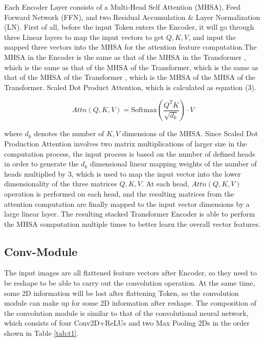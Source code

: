 \documentclass{article}
\begin{document}
Each Encoder Layer consists of a Multi-Head Self Attention (MHSA), Feed Forward Network (FFN), and two Residual Accumulation \& Layer Normalization (LN). First of all, before the input Token enters the Encoder, it will go through three Linear layers to map the input vectors to get $Q,K,V$, and input the mapped three vectors into the MHSA for the attention feature computation.The MHSA in the Encoder is the same as that of the MHSA in the Transformer \cite{9}, which is the same as that of the MHSA of the Transformer, which is the same as that of the MHSA of the Transformer \cite{9}, which is the MHSA of the MHSA of the Transformer. Scaled Dot Product Attention, which is calculated as equation (3).

\begin{equation}\label{e3}
	Attn(Q,K,V)=\mbox{Softmax}(\frac{Q^T K}{\sqrt{d_k }})\cdot V
\end{equation}


where $d_k$ denotes the number of $K,V$ dimensions of the MHSA. Since Scaled Dot Production Attention involves two matrix multiplications of larger size in the computation process, the input process is based on the number of defined heads in order to generate the $d_k$ dimensional linear mapping weights of the number of heads multiplied by 3, which is used to map the input vector into the lower dimensionality of the three matrices $Q,K,V$. At each head, $Attn(Q,K,V ) $operation is performed on each head, and the resulting matrices from the attention computation are finally mapped to the input vector dimensions by a large linear layer. The resulting stacked Transformer Encoder is able to perform the MHSA computation multiple times to better learn the overall vector features.

\subsection{Conv-Module}

The input images are all flattened feature vectors after Encoder, so they need to be reshape to be able to carry out the convolution operation. At the same time, some 2D information will be lost after flattening Token, so the convolution module can make up for some 2D information after reshape. The composition of the convolution module is similar to that of the convolutional neural network, which consists of four Conv2D+ReLUs and two Max Pooling 2Ds in the order shown in Table \ref{tab:t1}.
\end{document}
